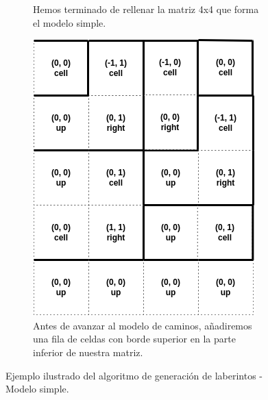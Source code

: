 \begin{figure}[H]
\begin{subfigure}[b]{0.95\textwidth}
            \caption{Hemos terminado de rellenar la matriz 4x4 que forma el modelo simple.}
        \end{subfigure}
        \par\bigskip
        \begin{subfigure}[b]{0.95\textwidth}
            \centering
            \includegraphics[scale=0.45]{img/paso9.png}
            \caption{Antes de avanzar al modelo de caminos, añadiremos una fila de celdas con borde superior en la parte inferior de nuestra matriz.}
        \end{subfigure}
        \caption{Ejemplo ilustrado del algoritmo de generación de laberintos - Modelo simple.}
        \label{fig:simple3}
    \end{figure}

